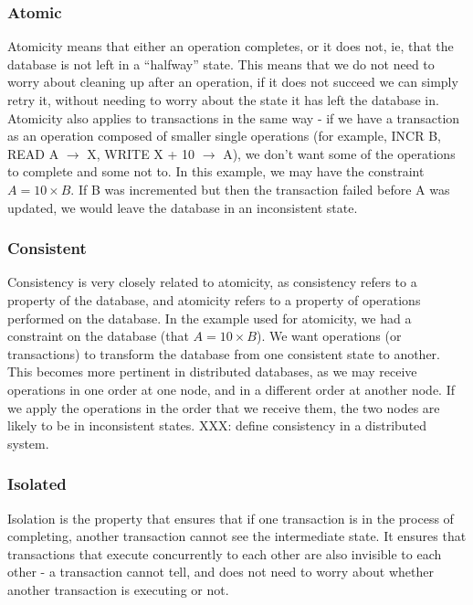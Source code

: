\documentclass[12pt,twoside,notitlepage]{report}
\begin{document}
\subsubsection*{Atomic}

Atomicity means that either an operation completes, or it does not, ie, that the database is not
left in a ``halfway'' state. This means that we do not need to worry about cleaning up after an
operation, if it does not succeed we can simply retry it, without needing to worry about the state
it has left the database in. Atomicity also applies to transactions in the same way - if we have a
transaction as an operation composed of smaller single operations (for example, INCR B, READ A
$\rightarrow$ X, WRITE X + 10 $\rightarrow$ A), we don't want some of the operations to complete
and some not to. In this example, we may have the constraint $A = 10\times B$. If B was
incremented but then the transaction failed before A was updated, we would leave the database in
an inconsistent state.

\subsubsection*{Consistent}

Consistency is very closely related to atomicity, as consistency refers to a property of the
database, and atomicity refers to a property of operations performed on the database. In the
example used for atomicity, we had a constraint on the database (that $A = 10\times B$). We want
operations (or transactions) to transform the database from one consistent state to another. This
becomes more pertinent in distributed databases, as we may receive operations in one order at one
node, and in a different order at another node. If we apply the operations in the order that we
receive them, the two nodes are likely to be in inconsistent states. XXX: define consistency in a
distributed system.

\subsubsection*{Isolated}

Isolation is the property that ensures that if one transaction is in the process of completing,
another transaction cannot see the intermediate state. It ensures that transactions that execute
concurrently to each other are also invisible to each other - a transaction cannot tell, and does
not need to worry about whether another transaction is executing or not.
\end{document}
